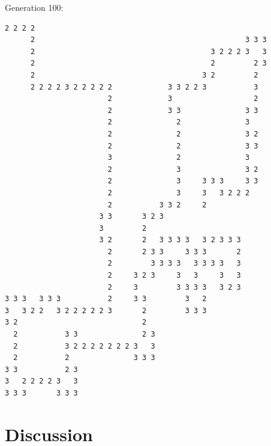 \documentclass[11pt]{article} %
\begin{document}
\pagebreak
\begin{center}
Generation 100:
\begin{verbatim}
2 2 2 2                                                         
      2                                                 3 3 3   
      2                                         3 2 2 2 3   3   
      2                                         2         2 3   
      2                                       3 2         2     
      2 2 2 2 3 2 2 2 2 2             3 3 2 2 3           3     
                        2             3                   2     
                        2             3 3               3 3     
                        2               2               3       
                        2               2               3 2     
                        2               2               3 3     
                        3               2               3       
                        2               3               3 2     
                        2               3     3 3 3     3 3     
                        2               3     3   3 2 2 2       
                        2           3 3 2     2                 
                      3 3       3 2 3                           
                      3         2                               
                      3 2       2   3 3 3 3   3 2 3 3 3         
                        2       2 3 3     3 3 3       2         
                        2         3 3 3 3   3 3 3 3   3         
                        2     3 2 3     3   3     3   3         
                        2     3         3 3 3 3   3 2 3         
3 3 3   3 3 3           2     3 3         3   2                 
3   3 2 2   3 2 2 2 2 2 3       2         3 3 3                 
3 2                             2                               
  2           3 3               2 3                             
  2           3 2 2 2 2 2 2 2 3   3                             
  2           2               3 3 3                             
3 3           2 3                                               
3   2 2 2 2 3   3                                               
3 3 3       3 3 3                                               
\end{verbatim}
\end{center}
\pagebreak

\section{Discussion}
\end{document}
